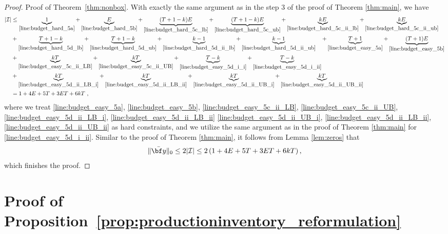 \documentclass[nonblindrev,mnsc]{informs3} %
\newcommand{\by}{{\bf y}}
\newcommand{\pran}[1]{\left(#1\right)}
\begin{document}
\begin{APPENDICES}
\begin{proof}{Proof of Theorem~\ref{thm:nonbox}.}
With exactly the same argument as in the step 3 of the proof of Theorem \ref{thm:main}, we have
 \begin{align*}
| \mathcal I|
&\le \underbrace{1}_{\eqref{line:budget_hard_5a}} +  \underbrace{E}_{\eqref{line:budget_hard_5b}} + \underbrace{(T+1-k)E}_{\eqref{line:budget_hard_5c_lb}}  + \underbrace{(T+1-k)E}_{\eqref{line:budget_hard_5c_ub}} + 
\underbrace{kE}_{\eqref{line:budget_hard_5c_ii_lb}}  + \underbrace{kE}_{\eqref{line:budget_hard_5c_ii_ub}}\\
& +\underbrace{T+1-k}_{\eqref{line:budget_hard_5d_lb}}+ \underbrace{T+1-k}_{\eqref{line:budget_hard_5d_ub}}+ \underbrace{k-1}_{\eqref{line:budget_hard_5d_ii_lb}}+ \underbrace{k-1}_{\eqref{line:budget_hard_5d_ii_ub}}
\quad + \underbrace{T+1}_{\eqref{line:budget_easy_5a}} + \underbrace{(T+1)E }_{\eqref{line:budget_easy_5b}} \\
&+ \underbrace{kT }_{\eqref{line:budget_easy_5c_ii_LB}} + 
\underbrace{kT }_{\eqref{line:budget_easy_5c_ii_UB}} +
\underbrace{T-k}_{\eqref{line:budget_easy_5d_i_i}}  +
\underbrace{T-k}_{\eqref{line:budget_easy_5d_i_ii}}  \\
& +
\underbrace{kT}_{\eqref{line:budget_easy_5d_ii_LB_i}} +
\underbrace{kT}_{\eqref{line:budget_easy_5d_ii_LB_ii}} +
\underbrace{kT}_{\eqref{line:budget_easy_5d_ii_UB_i}} +
\underbrace{kT}_{\eqref{line:budget_easy_5d_ii_UB_ii}} \\
&= 1 + 4E + 5T + 3ET + 6kT\ ,
 \end{align*}
 where we treat \eqref{line:budget_easy_5a}, \eqref{line:budget_easy_5b}, \eqref{line:budget_easy_5c_ii_LB}, \eqref{line:budget_easy_5c_ii_UB}, \eqref{line:budget_easy_5d_ii_LB_i}, \eqref{line:budget_easy_5d_ii_LB_ii} \eqref{line:budget_easy_5d_ii_UB_i}, \eqref{line:budget_easy_5d_ii_LB_ii}, \eqref{line:budget_easy_5d_ii_UB_ii} as hard constraints, and we utilize the same argument as in the proof of Theorem \ref{thm:main} for \eqref{line:budget_easy_5d_i_ii}.
Similar to the proof of Theorem \ref{thm:main}, it follows from Lemma \ref{lem:zeros} that
$$
\|\bar \by\|_0\le 2 | \mathcal I|\le 2\pran{1 + 4E + 5T + 3ET + 6kT},
$$
which finishes the proof. 
\halmos
\end{proof}

 







\section{Proof of Proposition~\ref{prop:productioninventory_reformulation}}


\end{APPENDICES}
\end{document}
